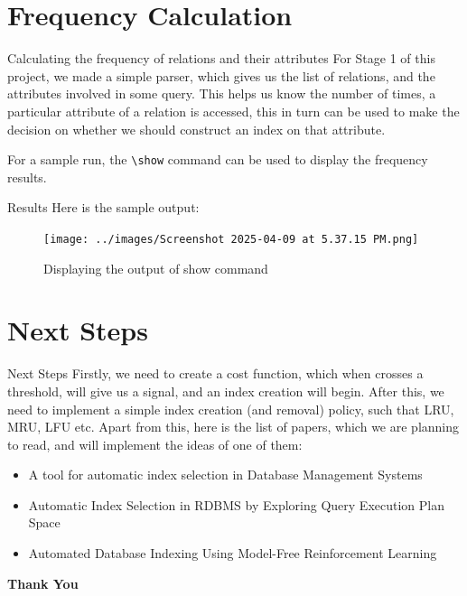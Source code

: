 \documentclass[Serif, 10pt, brown]{beamer}
\theoremstyle{example}
\theoremstyle{plain}
\begin{document}
\section{Frequency Calculation}
\begin{frame}{Calculating the frequency of relations and their attributes}
For Stage 1 of this project, we made a simple parser, which gives us the list of relations, and the attributes involved in some query. This helps us know the number of times, a particular attribute of a relation is accessed, this in turn can be used to make the decision on whether we should construct an index on that attribute.

For a sample run, the \texttt{\textbackslash show} command can be used to display the frequency results.
\end{frame}

\begin{frame}{Results}
	Here is the sample output:
	\begin{figure}[H]
		\texttt{[image: ../images/Screenshot 2025-04-09 at 5.37.15 PM.png]}
		\caption{Displaying the output of show command}
	\end{figure}
\end{frame}

\section{Next Steps}

\begin{frame}{Next Steps}
	Firstly, we need to create a cost function, which when crosses a threshold, will give us a signal, and an index creation will begin. After this, we need to implement a simple index creation (and removal) policy, such that LRU, MRU, LFU etc. Apart from this, here is the list of papers, which we are planning to read, and will implement the ideas of one of them:
	\begin{itemize}
		\item A tool for automatic index selection in Database Management Systems
		\item Automatic Index Selection in RDBMS by Exploring Query Execution Plan Space
		\item Automated Database Indexing Using Model-Free Reinforcement Learning
	\end{itemize}
\end{frame}

\begin{frame}
    \Huge{\centerline{\bf Thank You}}
\end{frame}
\end{document}
